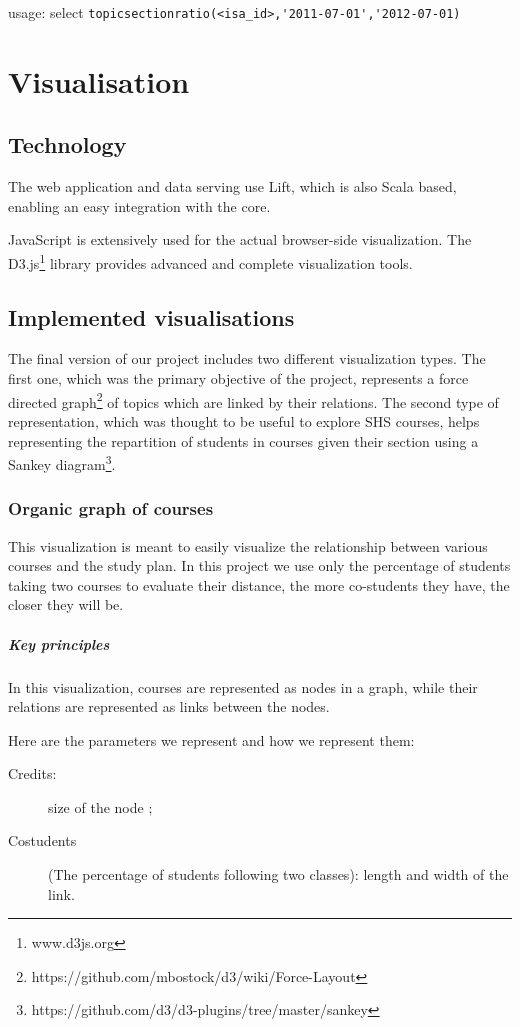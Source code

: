 usage: select \verb|topicsectionratio(<isa_id>,'2011-07-01','2012-07-01)|

\chapter{Visualisation}

\section{Technology}
The web application and data serving use Lift, which is also Scala based, enabling an easy integration with the core.

JavaScript is extensively used for the actual browser-side visualization. The D3.js\footnote{www.d3js.org} library provides advanced and complete visualization tools. 

\section{Implemented visualisations}
The final version of our project includes two different visualization types. The first one, which was the primary objective of the project, represents a force directed graph\footnote{https://github.com/mbostock/d3/wiki/Force-Layout} of topics which are linked by their relations. The second type of representation, which was thought to be useful to explore SHS courses, helps representing the repartition of students in courses given their section using a Sankey diagram\footnote{https://github.com/d3/d3-plugins/tree/master/sankey}. 

\subsection{Organic graph of courses}
This visualization is meant to easily visualize the relationship between various courses and the study plan. In this project we use only the percentage of students taking two courses to evaluate their distance, the more co-students they have, the closer they will be.  

\paragraph{Key principles}
In this visualization, courses are represented as nodes in a graph, while their relations are represented as links between the nodes. 

Here are the parameters we represent and how we represent them: 
\begin{description}
\item[Credits:] size of the node ;
\item[Costudents] (The percentage of students following two classes): length and width of the link.
\end{description}

